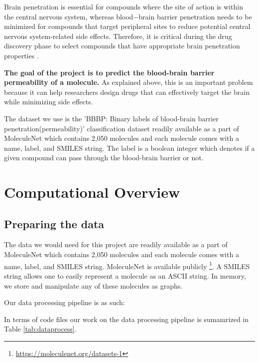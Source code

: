 \documentclass[fontsize=11pt]{article}
\begin{document}
Brain penetration is essential for compounds where the site of action is within the central nervous system, whereas blood$-$brain barrier penetration needs to be minimized for compounds that target peripheral sites to reduce potential central nervous system-related side effects. Therefore, it is critical during the drug discovery phase to select compounds that have appropriate brain penetration properties \citep{liu2004development}.

{\bf The goal of the project is to predict the blood-brain barrier permeability of a molecule.} As explained above, this is an important problem because it can help researchers design drugs that can effectively target the brain while minimizing side effects.

The dataset we use is the 'BBBP: Binary labels of blood-brain barrier penetration(permeability)' classification dataset readily available as a part of MoleculeNet \citep{wu2018moleculenet} which contains 2,050 molecules and each molecule comes with a name, label, and SMILES string. The label is a boolean integer which denotes if a given compound can pass through the blood-brain barrier or not.

\section*{Computational Overview}

\subsection*{Preparing the data}

The data we would need for this project are readily available as a part of MoleculeNet \citep{wu2018moleculenet} which contains 2,050 molecules and each molecule comes with a name, label, and SMILES string. MoleculeNet is available publicly \footnote{\url{https://moleculenet.org/datasets-1}}. A SMILES string allows one to easily represent a molecule as an ASCII string. In memory, we store and manipulate any of these molecules as graphs.

Our data processing pipeline is as such:

In terms of code files our work on the data processing pipeline is sumamrized in Table \ref{tab:dataprocess}.
\end{document}
